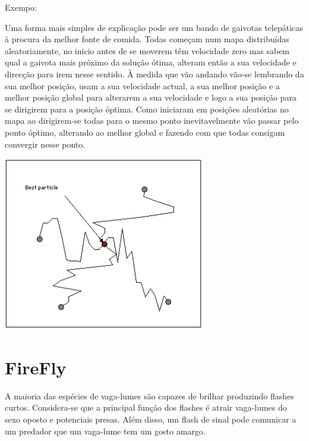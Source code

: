 \documentclass[10pt]{article}
\begin{document}
Exempo:

Uma forma mais simples de explicação pode ser um bando de gaivotas telepáticas à procura da melhor fonte de comida. Todas começam num mapa distribuídas aleatoriamente, no inicio antes de se moverem têm velocidade
zero mas sabem qual a gaivota mais próximo da solução ótima, alteram então a sua velocidade e direcção para
irem nesse sentido. À medida que vão andando vão-se lembrando da sua melhor posição, usam a sua velocidade actual, a sua melhor posição e a melhor posição global para alterarem a sua velocidade e logo a sua
posição para se dirigirem para a posição óptima. Como iniciaram em posições aleatórias no mapa ao dirigirem-se todas para o mesmo ponto inevitavelmente vão passar pelo ponto óptimo, alterando ao
melhor global e fazendo com que todas consigam convergir nesse ponto.

\includegraphics{img/PSO.png}

\section{FireFly}\label{sec:firefly}
A maioria das espécies de vaga-lumes são capazes de brilhar produzindo flashes curtos. Considera-se que a principal função 
dos flashes é atrair vaga-lumes do sexo oposto e potenciais presas. Além disso, um flash de sinal pode comunicar a um 
predador que um vaga-lume tem um gosto amargo. 
\end{document}
